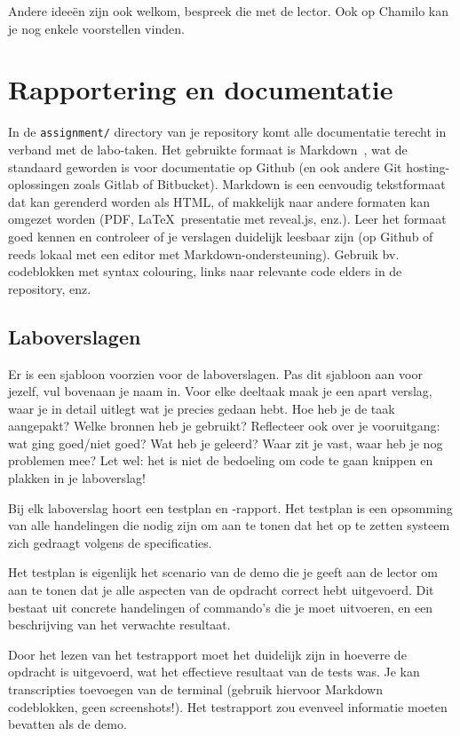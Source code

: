 Andere ideeën zijn ook welkom, bespreek die met de lector. Ook op Chamilo kan je nog enkele voorstellen vinden.

\section{Rapportering en documentatie}
\label{sec:rapportering-en-documentatie}

In de \texttt{assignment/} directory van je repository komt alle documentatie terecht in verband met de labo-taken. Het gebruikte formaat is Markdown~\autocite{Gruber2004,Github2016}, wat de standaard geworden is voor documentatie op Github (en ook andere Git hosting-oplossingen zoals Gitlab of Bitbucket). Markdown is een eenvoudig tekstformaat dat kan gerenderd worden als HTML, of makkelijk naar andere formaten kan omgezet worden (PDF, \LaTeX\, presentatie met reveal.js, enz.). Leer het formaat goed kennen en controleer of je verslagen duidelijk leesbaar zijn (op Github of reeds lokaal met een editor met Markdown-ondersteuning). Gebruik bv. codeblokken met syntax colouring, links naar relevante code elders in de repository, enz.

\subsection{Laboverslagen}
\label{subs:laboverslagen}

Er is een sjabloon voorzien voor de laboverslagen. Pas dit sjabloon aan voor jezelf, vul bovenaan je naam in. Voor elke deeltaak maak je een apart verslag, waar je in detail uitlegt wat je precies gedaan hebt. Hoe heb je de taak aangepakt? Welke bronnen heb je gebruikt? Reflecteer ook over je vooruitgang: wat ging goed/niet goed? Wat heb je geleerd? Waar zit je vast, waar heb je nog problemen mee? Let wel: het is niet de bedoeling om code te gaan knippen en plakken in je laboverslag!

Bij elk laboverslag hoort een testplan en -rapport. Het testplan is een opsomming van alle handelingen die nodig zijn om aan te tonen dat het op te zetten systeem zich gedraagt volgens de specificaties.

Het testplan is eigenlijk het scenario van de demo die je geeft aan de lector om aan te tonen dat je alle aspecten van de opdracht correct hebt uitgevoerd. Dit bestaat uit concrete handelingen of commando's die je moet uitvoeren, en een beschrijving van het verwachte resultaat.

Door het lezen van het testrapport moet het duidelijk zijn in hoeverre de opdracht is uitgevoerd, wat het effectieve resultaat van de tests was. Je kan transcripties toevoegen van de terminal (gebruik hiervoor Markdown codeblokken, geen screenshots!). Het testrapport zou evenveel informatie moeten bevatten als de demo.

